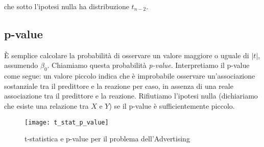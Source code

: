 che sotto l'ipotesi nulla ha distribuzione $t_{n-2}$.

\subsection{p-value}

È semplice calcolare la probabilità di osservare un valore maggiore o uguale di $|t|$, assumendo ${\beta}_0$. Chiamiamo questa probabilità \textit{p-value}. Interpretiamo il p-value come segue: un valore piccolo indica che è improbabile osservare un'associazione sostanziale tra il predittore e la reazione per caso, in assenza di una reale associazione tra il predittore e la reazione. Rifiutiamo l'ipotesi nulla (dichiariamo che esiste una relazione tra $X$ e $Y$) se il p-value è sufficientemente piccolo.

\begin{figure}[H]
\centering
\texttt{[image: t\_stat\_p\_value]}
\caption{t-statistica e p-value per il problema dell'Advertising}
\end{figure}
